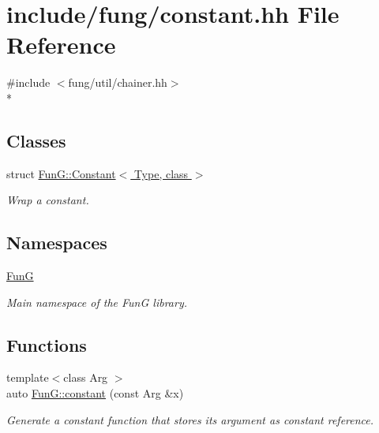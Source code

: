 \hypertarget{constant_8hh}{\section{include/fung/constant.hh File Reference}
\label{constant_8hh}
}
{\ttfamily \#include $<$fung/util/chainer.\-hh$>$}\\*
\subsection*{Classes}
\begin{DoxyCompactItemize}
\item 
struct \hyperlink{structFunG_1_1Constant}{Fun\-G\-::\-Constant$<$ Type, class $>$}
\begin{DoxyCompactList}\small\item\em Wrap a constant. \end{DoxyCompactList}\end{DoxyCompactItemize}
\subsection*{Namespaces}
\begin{DoxyCompactItemize}
\item 
\hyperlink{namespaceFunG}{Fun\-G}
\begin{DoxyCompactList}\small\item\em Main namespace of the Fun\-G library. \end{DoxyCompactList}\end{DoxyCompactItemize}
\subsection*{Functions}
\begin{DoxyCompactItemize}
\item 
{\footnotesize template$<$class Arg $>$ }\\auto \hyperlink{namespaceFunG_a65c509062b62b3303268cabc97b75a65}{Fun\-G\-::constant} (const Arg \&x)
\begin{DoxyCompactList}\small\item\em Generate a constant function that stores its argument as constant reference. \end{DoxyCompactList}\end{DoxyCompactItemize}
